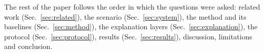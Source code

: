 The rest of the paper follows the order in which the questions were asked: related work (Sec.~\ref{sec:related}), the scenario (Sec.~\ref{sec:system}), the method and its baselines (Sec.~\ref{sec:method}), the explanation layers (Sec.~\ref{sec:explanation}), the protocol (Sec.~\ref{sec:protocol}), results (Sec.~\ref{sec:results}), discussion, limitations and conclusion.
